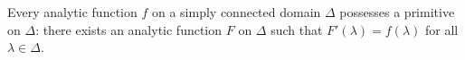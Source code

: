 Every analytic function $f$ on a simply connected domain $\Delta$ possesses a primitive on $\Delta$: there exists an analytic function $F$ on $\Delta$ such that $F'(\lambda) = f(\lambda)$ for all $\lambda \in \Delta$.

